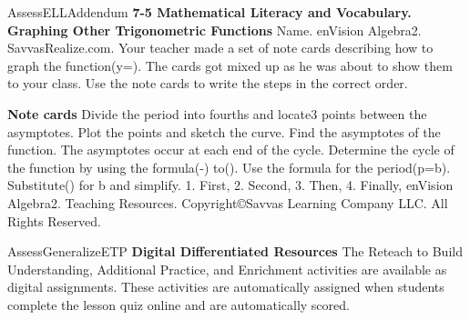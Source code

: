\documentclass{article}
\newenvironment{te-addendum}[2]{}{}     %
\newcommand{\answer}[1]{}               %
\newcommand{\placeholder}[2]{}          %
\newcommand{\te}[1]{}                   %
\begin{document}
\begin{te-addendum}{Assess}{ELLAddendum}
\textbf{7-5 Mathematical Literacy and Vocabulary. Graphing Other Trigonometric Functions}
Name\underline{\hspace{2cm}}. enVision Algebra2. SavvasRealize.com.
Your teacher made a set of note cards describing how to graph the function(y=\tan{}\pi\theta). The cards got mixed up as he was about to show them to your class. Use the note cards to write the steps in the correct order.
\te{Printed coefficient appears1/2 pi, and the period note card explicitly says substitute1/2 pi for b.}
\textbf{Note cards}
Divide the period into fourths and locate3 points between the asymptotes. Plot the points and sketch the curve.
Find the asymptotes of the function. The asymptotes occur at each end of the cycle.
Determine the cycle of the function by using the formula(-\frac{}) to(\frac{}).
Use the formula for the period(p=\frac\pi b). Substitute(\pi) for b and simplify.
1. First,\answer{use the formula for the period(p=\frac\pi b). Substitute(\frac12\pi) for b and simplify.}
2. Second,\answer{determine the cycle of the function by using the formula(-\frac\pi{2b}) to(\frac\pi{2b}).}
3. Then,\answer{find the asymptotes of the function. The asymptotes occur at each end of the cycle.}
4. Finally,\answer{divide the period into fourths and locate3 points between the asymptotes. Plot the points and sketch the curve.}
enVision Algebra2. Teaching Resources. Copyright©Savvas Learning Company LLC. All Rights Reserved.
\end{te-addendum}
\begin{te-addendum}{Assess}{GeneralizeETP}
\textbf{Digital Differentiated Resources}
The Reteach to Build Understanding, Additional Practice, and Enrichment activities are available as digital assignments. These activities are automatically assigned when students complete the lesson quiz online and are automatically scored.
\te{Tablet example screen: Exit. Solve the system of equations by graphing. (y=3x+4),(y=-2x+4). Use the graphing tool to graph the system. Click to enlarge graph. Question Help:Help Me Solve This;View an Example;Video;Textbook;Glossary;Math Tools;Print. Click the graph,choose a tool in the palette and follow the instructions to create your graph.1 part remaining.Clear All.Check Answer.Review progress.Question5 of14.Go.Back.Next.}
\placeholder{illustration}{Blacktabletwithhomebuttonleft,white digitalmathscreen linear system3x+4,-2x+4,blankgridupperright labeledx,y,-10,-8,...10 withunitgrid,origin0;QuestionHelpdropdown;bluefooterwithbuttons andprogressbar.}
\end{te-addendum}
\end{document}
